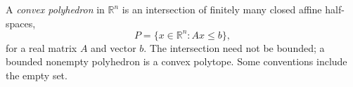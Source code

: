 
A \emph{convex polyhedron} in $\mathbb R^n$ is an intersection of finitely many closed affine half-spaces,
\[
P=\{x\in\mathbb R^n:Ax\le b\},
\]
for a real matrix $A$ and vector $b$. The intersection need not be bounded; a bounded nonempty polyhedron is a convex polytope. Some conventions include the empty set.
